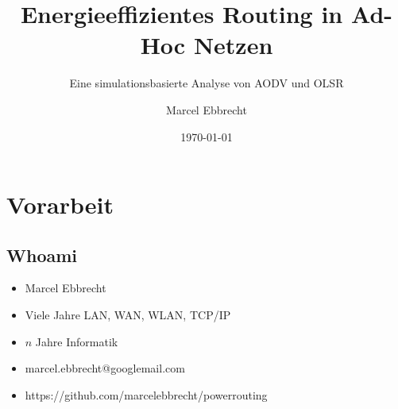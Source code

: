 \documentclass[11pt,handout,notes=only]{beamer}
\title{Energieeffizientes Routing in Ad-Hoc Netzen}
\subtitle{Eine simulationsbasierte Analyse von AODV und OLSR}
\author{Marcel Ebbrecht}
\institute{TU Dortmund, Bachelorabschlussvortrag}
\date{\today}
\begin{document}
\setlength{\parskip}{1mm}

\begin{frame}[c,label=titlepage]
  \titlepage
\end{frame}

\logo{}
  \setcounter{tocdepth}{1}


\section{Vorarbeit}

\subsection{Whoami}

\begin{frame}{\insertsubsection}
\begin{itemize}
\item Marcel Ebbrecht\newline
\item Viele Jahre LAN, WAN, WLAN, TCP/IP\newline
\item $n$ Jahre Informatik\newline
\item marcel.ebbrecht@googlemail.com\newline
\item https://github.com/marcelebbrecht/powerrouting
\end{itemize}
\end{frame}



\end{document}
